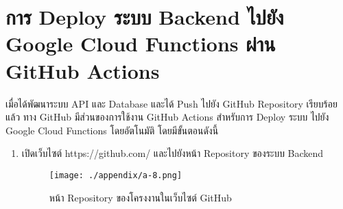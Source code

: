 \section{การ Deploy ระบบ Backend ไปยัง Google Cloud Functions ผ่าน GitHub Actions}
เมื่อได้พัฒนาระบบ API และ Database และได้ Push ไปยัง GitHub Repository เรียบร้อยแล้ว ทาง GitHub มีส่วนของการใช้งาน GitHub Actions สำหรับการ Deploy ระบบ ไปยัง Google Cloud Functions โดยอัตโนมัติ โดยมีขั้นตอนดังนี้
\begin{enumerate}
    \item เปิดเว็บไซต์ https://github.com/ และไปยังหน้า Repository ของระบบ Backend
    \begin{figure}
        \texttt{[image: ./appendix/a-8.png]}
        \caption{หน้า Repository ของโครงงานในเว็บไซต์ GitHub}
    \end{figure}
\end{enumerate}